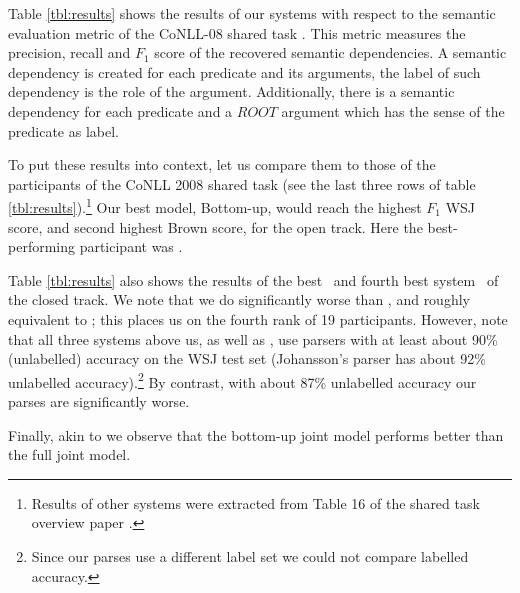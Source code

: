 
Table \ref{tbl:results} shows the results of our systems with respect to the semantic evaluation metric of the CoNLL-08 shared task \citep{surdeanu08conll}. This metric measures the precision, recall and $F_1$ score of the recovered semantic dependencies. A semantic dependency is created for each predicate and its arguments, the label of such dependency is the role of the argument. Additionally, there is a semantic dependency for each predicate and a $ROOT$ argument which has the sense of the predicate as label.



To put these results into context, let us compare them to those of the participants of the CoNLL 2008 shared task (see the last three rows of table \ref{tbl:results}).\footnote{Results of other systems were extracted from Table 16 of the shared task overview paper \citep{surdeanu08conll}.} Our best model, Bottom-up, would reach the highest $F_1$ WSJ score, and second highest Brown score, for the open track. Here the best-performing participant was \citet{vickrey08applying}. 

Table \ref{tbl:results} also shows the results of the best~\citep{johansson08dependency} and fourth best system~\citep{zhao08parsing} of the closed track. We note that we do significantly worse than \citet{johansson08dependency}, and roughly equivalent to \citet{zhao08parsing}; this places us on the fourth rank of 19 participants. However, note that all three systems above us, as well as  \citet{zhao08parsing}, use parsers with at least about 90\% (unlabelled) accuracy on the WSJ test set (Johansson's parser has about 92\% unlabelled accuracy).\footnote{Since our parses use a different label set we could not compare labelled accuracy.} By contrast, with about 87\% unlabelled accuracy our parses are significantly worse.   

Finally, akin to \citet{riedel08collective} we observe that the bottom-up joint model performs better than the full joint model. %

